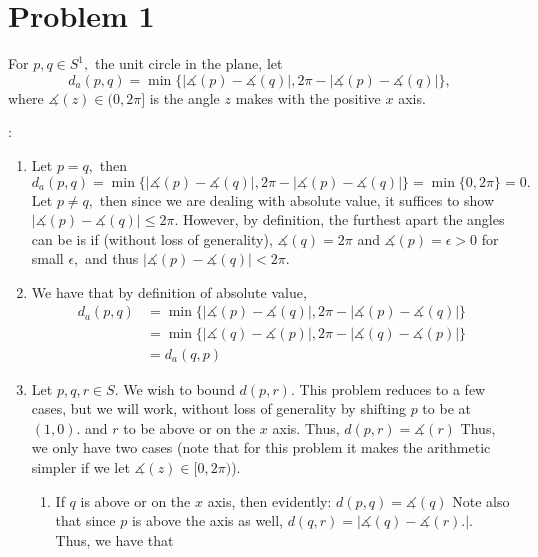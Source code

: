 \documentclass[11pt]{article}
\begin{document}
	
	
	\psetheader

\section*{Problem 1}
\begin{problem}
    For $p,q\in S^1,$ the unit circle in the plane, let \[d_a(p,q) = \min\{|\measuredangle(p) - \measuredangle(q)|, 2\pi - |\measuredangle(p) - \measuredangle(q)|\},\] where $\measuredangle(z)\in (0,2\pi]$ is the angle $z$ makes with the positive $x$ axis. 
\end{problem}
\begin{solution}:\\
    \begin{enumerate}
        \item Let $p=q,$ then 
        \[d_a(p,q) = \min\{|\measuredangle(p) - \measuredangle(q)|, 2\pi  - |\measuredangle(p) - \measuredangle(q)|\} = \min\{0, 2\pi\} = 0.\]
        Let $p\neq q,$ then since we are dealing with absolute value, it suffices to show $|\measuredangle(p) - \measuredangle(q)|\leq 2\pi.$ However, by definition, the furthest apart the angles can be is if (without loss of generality), $\measuredangle(q) = 2\pi$ and $\measuredangle(p) = \epsilon>0$ for small $\epsilon,$ and thus $|\measuredangle(p) - \measuredangle(q)|<2\pi.$
        \item We have that by definition of absolute value, 
        \begin{align*}
            d_a(p,q) &= \min\{|\measuredangle(p) - \measuredangle(q)|, 2\pi - |\measuredangle(p) - \measuredangle(q)|\}\\ &= \min\{|\measuredangle(q) - \measuredangle(p)|, 2\pi - |\measuredangle(q) - \measuredangle(p)|\}\\ &= d_a(q,p)
        \end{align*}
        \item Let $p,q,r\in S.$ We wish to bound $d(p,r).$ This problem reduces to a few cases, but we will work, without loss of generality by shifting $p$ to be at $(1,0).$ and $r$ to be above or on the $x$ axis. Thus, $d(p,r) = \measuredangle(r)$
        Thus, we only have two cases (note that for this problem it makes the arithmetic simpler if we let $\measuredangle(z)\in [0,2\pi)$).
        \begin{enumerate}
            \item If $q$ is above or on the $x$ axis, then evidently: $d(p,q) = \measuredangle(q)$ Note also that since $p$ is above the axis as well, $d(q,r) = |\measuredangle(q) - \measuredangle(r).|.$ Thus, we have that 

\end{enumerate}
\end{enumerate}
\end{solution}
\end{document}
